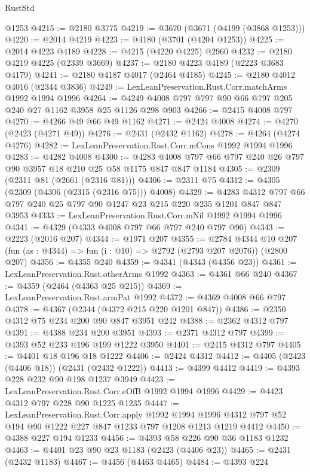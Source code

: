 \begin{lexlean}{RustStd}
\begin{coremodule}
    @1253
@4215 := @2180 @3775
@4219 := @3670 (@3671 (@4199 (@3868 @1253)))
@4220 := @2014 @4219
@4223 := @4180 (@3701 (@4204 @1253))
@4225 := @2014 @4223 @4189
@4228 := @4215 (@4220 @4225) @2960
@4232 := @2180 @4219 @4225 (@2339 @3669)
@4237 := @2180 @4223 @4189 (@2223 @3683 @4179)
@4241 := @2180 @4187 @4017 (@2464 @4185)
@4245 := @2180 @4012 @4016 (@2344 @3836)
@4249 := LexLeanPreservation.Rust.Corr.matchArms @1992 @1994 @1996
@4264 := @4249 @4008 @797 @797 @90 @66 @797 @205 @240 @27 @1162 @3958 @25 @1126 @298 @903
@4266 := @2415 @4008 @797
@4270 := @4266 @49 @66 @49 @1162
@4271 := @2424 @4008
@4274 := @4270 (@2423 (@4271 @49))
@4276 := @2431 (@2432 @1162)
@4278 := @4264 (@4274 @4276)
@4282 := LexLeanPreservation.Rust.Corr.mCons @1992 @1994 @1996
@4283 := @4282 @4008
@4300 := @4283 @4008 @797 @66 @797 @240 @26 @797 @90 @3957 @18 @210 @25 @58 @1175 @847 @847 @1184
@4305 := @2309 (@2311 @81 (@2661 (@2316 @81)))
@4306 := @2311 @75
@4312 := @4305 (@2309 (@4306 (@2315 (@2316 @75))) @4008)
@4329 := @4283 @4312 @797 @66 @797 @240 @25 @797 @90 @1247 @23 @215 @220 @235 @1201 @847 @847 @3953
@4333 := LexLeanPreservation.Rust.Corr.mNil @1992 @1994 @1996
@4341 := @4329 (@4333 @4008 @797 @66 @797 @240 @797 @90)
@4343 := @2223 (@2016 @207)
@4344 := @1971 @207
@4355 := @2784
    @4344
    @10
    @207
    (fun (as : @4344) => fun (i : @10) => @2792 (@2793 @207 @2076))
    (@2800 @207)
@4356 := @4355 @240
@4359 := @4341 (@4343 (@4356 @23))
@4361 := LexLeanPreservation.Rust.otherArms @1992
@4363 := @4361 @66 @240
@4367 := @4359 (@2464 (@4363 @25 @215))
@4369 := LexLeanPreservation.Rust.armPat @1992
@4372 := @4369 @4008 @66 @797
@4378 := @4367 (@2344 (@4372 @215 @220 @1201 @847))
@4386 := @2350 @4312 @75 @234 @200 @90 @847 @3951 @242
@4388 := @2362 @4312 @797
@4391 := @4388 @234 @200 @3951
@4393 := @2371 @4312 @797
@4399 := @4393 @52 @233 @196 @199 @1222 @3950
@4401 := @2415 @4312 @797
@4405 := @4401 @18 @196 @18 @1222
@4406 := @2424 @4312
@4412 := @4405 (@2423 (@4406 @18)) (@2431 (@2432 @1222))
@4413 := @4399 @4412
@4419 := @4393 @228 @232 @90 @198 @1237 @3949
@4423 := LexLeanPreservation.Rust.Corr.eOfB @1992 @1994 @1996
@4429 := @4423 @4312 @797 @228 @90 @1225 @1235
@4447 := LexLeanPreservation.Rust.Corr.apply
    @1992
    @1994
    @1996
    @4312
    @797
    @52
    @194
    @90
    @1222
    @227
    @847
    @1233
    @797
    @1208
    @1213
    @1219
    @4412
@4450 := @4388 @227 @194 @1233
@4456 := @4393 @58 @226 @90 @36 @1183 @1232
@4463 := @4401 @23 @90 @23 @1183 (@2423 (@4406 @23))
@4465 := @2431 (@2432 @1183)
@4467 := @4456 (@4463 @4465)
@4484 := @4393
    @224

\end{coremodule}
\end{lexlean}
